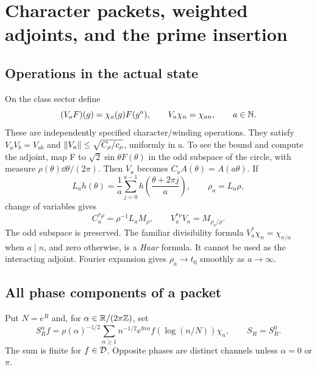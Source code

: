 \section{Character packets, weighted adjoints, and the prime insertion}\label{sec:characters}
\subsection{Operations in the actual state}
On the class sector define
\begin{equation}
(V_aF)(g)=\chi_a(g)F(g^a),\qquad V_a\chi_n=\chi_{an},
\qquad a\in\mathbb N.
\end{equation}
These are independently specified character/winding operations. They
satisfy $V_aV_b=V_{ab}$ and
$\lVert V_a\rVert\le\sqrt{C_\rho/c_\rho}$, uniformly in a.
To see the bound and compute the adjoint, map F to
$\sqrt2\sin\theta F(\theta)$ in the odd subspace of the circle, with
measure $\rho(\theta)\dd\theta/(2\pi)$. Then $V_a$ becomes
$C_aA(\theta)=A(a\theta)$. If
\begin{equation}
L_ah(\theta)=\frac1a\sum_{j=0}^{a-1}
h\left(\frac{\theta+2\pi j}{a}\right),\qquad \rho_a=L_a\rho,
\end{equation}
change of variables gives
\begin{equation}\label{eq:weighted-adjoint}
C_a^{*\rho}=\rho^{-1}L_aM_\rho,\qquad
V_a^{*\nu}V_a=M_{\rho_a/\rho}.
\end{equation}
The odd subspace is preserved. The familiar divisibility formula
$V_a^*\chi_n=\chi_{n/a}$ when $a\mid n$, and zero otherwise, is a
\emph{Haar} formula. It cannot be used as the interacting adjoint.
Fourier expansion gives $\rho_a\to t_0$ smoothly as $a\to\infty$.

\subsection{All phase components of a packet}
Put $N=e^R$ and, for $\alpha\in\mathbb R/(2\pi\mathbb Z)$, set
\begin{equation}\label{eq:phase-packets}
S_R^\alpha f=\rho(\alpha)^{-1/2}
\sum_{n\ge1}n^{-1/2}e^{\ii n\alpha}f(\log(n/N))\chi_n,
\qquad S_R=S_R^0 .
\end{equation}
The sum is finite for $f\in\mathcal D$. Opposite phases are distinct channels
unless $\alpha=0$ or $\pi$.

